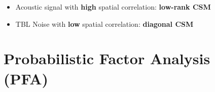 \documentclass[10pt,xcolor=x11names,compress, show notes]{beamer}%
\begin{document}
\begin{frame}[t]{\insertsectionhead}
	\begin{itemize}
		\setlength{\itemindent}{1cm}
		\item<3-> \textcolor{source}{Acoustic signal} with \textbf{high} spatial correlation: {\bfseries low-rank CSM}\\ %
		\item<3-> \textcolor{rouge}{TBL Noise} with \textbf{low} spatial correlation: {\bfseries diagonal CSM}\\		
	\end{itemize}
\end{frame}


\section{Probabilistic Factor Analysis (PFA)}
\end{document}
